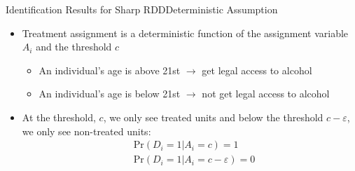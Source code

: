 \documentclass[dvipsnames,hyperref={pdfpagelabels=false}]{beamer}
\begin{document}
\begin{frame}{Identification Results for Sharp RDD}{Deterministic Assumption}
	\begin{itemize}
		\begin{block}{Deterministic Assumption}
			\begin{equation*}
			D_i=1\{A_i\geq c\} \quad \forall i
			\end{equation*}
		\end{block}
		
		\item Treatment assignment is a deterministic function of the assignment variable $A_{i}$ and the threshold $c$	
		\vspace{0.2cm}
		\begin{itemize}
			\item An individual's age is above 21st $\rightarrow$ get legal access to alcohol
			\vspace{0.2cm}
			\item An individual's age is below 21st $\rightarrow$ not get legal access to alcohol
		\end{itemize}
		\vspace{0.2cm}
		\item At the threshold, $c$, we only see treated units and below the threshold $c-\varepsilon$, we only see non-treated units:
		\begin{equation*}
		\begin{aligned}
		& \mathrm{Pr}(D_i=1|A_i=c)=1 \\
		& \mathrm{Pr}(D_i=1|A_i=c-\varepsilon)=0
		\end{aligned}
		\end{equation*}
	\end{itemize}
\end{frame}
\end{document}
